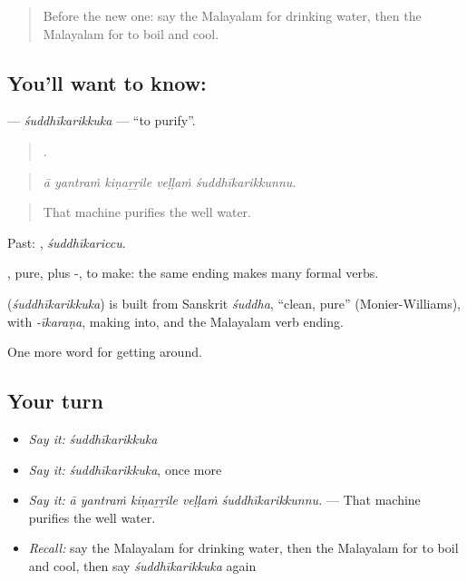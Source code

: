 \label{lesson:ML-C484-suddhikarikkuka}



\begin{quote}
Before the new one: say the Malayalam for drinking water, then the Malayalam for to boil and cool.
\end{quote}

\subsection*{You'll want to know: }
\textbf{} — \emph{śuddhīkarikkuka} — \textquotedblleft{}to purify\textquotedblright{}.

\begin{quote}
    .
\end{quote}

\begin{quote}
\emph{ā yantraṁ kiṇaṟṟile veḷḷaṁ śuddhīkarikkunnu.}
\end{quote}

\begin{quote}
That machine purifies the well water.
\end{quote}

Past: , \emph{śuddhīkariccu}.

, pure, plus -, to make: the same ending makes many formal verbs.

\begin{cousinweb}
\textbf{} (\emph{śuddhīkarikkuka}) is built from Sanskrit \emph{śuddha}, \textquotedblleft{}clean, pure\textquotedblright{} (Monier-Williams), with \emph{-īkaraṇa}, making into, and the Malayalam verb ending.
\end{cousinweb}

\begin{grammarlens}[title={What you've built}]
One more word for getting around.
\end{grammarlens}

\subsection*{Your turn}
\begin{itemize}
\raggedright
  \item \emph{Say it:} \emph{śuddhīkarikkuka}
  \item \emph{Say it:} \emph{śuddhīkarikkuka}, once more
  \item \emph{Say it:} \emph{ā yantraṁ kiṇaṟṟile veḷḷaṁ śuddhīkarikkunnu.} — That machine purifies the well water.
  \item \emph{Recall:} say the Malayalam for drinking water, then the Malayalam for to boil and cool, then say \emph{śuddhīkarikkuka} again
\end{itemize}

